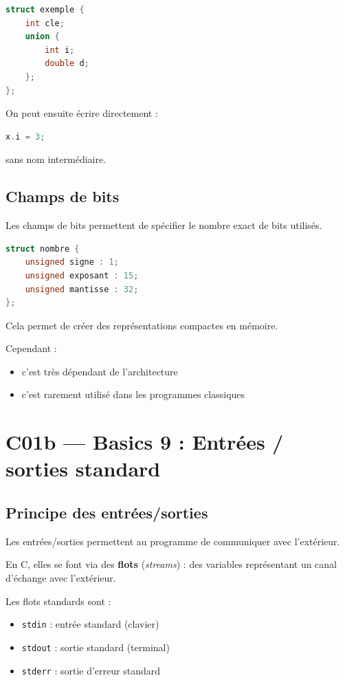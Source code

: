 \begin{lstlisting}[language=C]
struct exemple {
    int cle;
    union {
        int i;
        double d;
    };
};
\end{lstlisting}

On peut ensuite écrire directement :

\begin{lstlisting}[language=C]
x.i = 3;
\end{lstlisting}

sans nom intermédiaire.

\subsection{Champs de bits}

Les champs de bits permettent de spécifier le nombre exact de bits utilisés.

\begin{lstlisting}[language=C]
struct nombre {
    unsigned signe : 1;
    unsigned exposant : 15;
    unsigned mantisse : 32;
};
\end{lstlisting}

Cela permet de créer des représentations compactes en mémoire.

Cependant :

\begin{itemize}
    \item c’est très dépendant de l’architecture
    \item c’est rarement utilisé dans les programmes classiques
\end{itemize}

\section{C01b — Basics 9 : Entrées / sorties standard}

\subsection{Principe des entrées/sorties}

Les entrées/sorties permettent au programme de communiquer avec l’extérieur.

En C, elles se font via des \textbf{flots} (\textit{streams}) :
des variables représentant un canal d’échange avec l’extérieur.

Les flots standards sont :

\begin{itemize}
    \item \texttt{stdin} : entrée standard (clavier)
    \item \texttt{stdout} : sortie standard (terminal)
    \item \texttt{stderr} : sortie d’erreur standard
\end{itemize}

